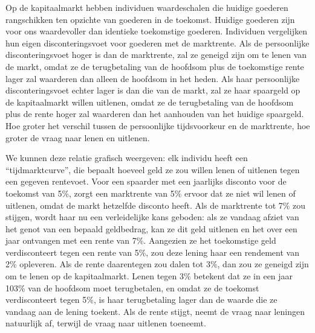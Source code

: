 Op de kapitaalmarkt hebben individuen waardeschalen die huidige goederen rangschikken ten opzichte van goederen in de toekomst. Huidige goederen zijn voor ons waardevoller dan identieke toekomstige goederen. Individuen vergelijken hun eigen disconteringsvoet voor goederen met de marktrente. Als de persoonlijke disconteringsvoet hoger is dan de marktrente, zal ze geneigd zijn om te lenen van de markt, omdat ze de terugbetaling van de hoofdsom plus de toekomstige rente lager zal waarderen dan alleen de hoofdsom in het heden. Als haar persoonlijke disconteringsvoet echter lager is dan die van de markt, zal ze haar spaargeld op de kapitaalmarkt willen uitlenen, omdat ze de terugbetaling van de hoofdsom plus de rente hoger zal waarderen dan het aanhouden van het huidige spaargeld. Hoe groter het verschil tussen de persoonlijke tijdsvoorkeur en de marktrente, hoe groter de vraag naar lenen en uitlenen.

We kunnen deze relatie grafisch weergeven: elk individu heeft een ``tijdmarktcurve'', die bepaalt hoeveel geld ze zou willen lenen of uitlenen tegen een gegeven rentevoet. Voor een spaarder met een jaarlijks disconto voor de toekomst van 5\%, zorgt een marktrente van 5\% ervoor dat ze niet wil lenen of uitlenen, omdat de markt hetzelfde disconto heeft. Als de marktrente tot 7\% zou stijgen, wordt haar nu een verleidelijke kans geboden: als ze vandaag afziet van het genot van een bepaald geldbedrag, kan ze dit geld uitlenen en het over een jaar ontvangen met een rente van 7\%. Aangezien ze het toekomstige geld verdisconteert tegen een rente van 5\%, zou deze lening haar een rendement van 2\% opleveren. Als de rente daarentegen zou dalen tot 3\%, dan zou ze geneigd zijn om te lenen op de kapitaalmarkt. Lenen tegen 3\% betekent dat ze in een jaar 103\% van de hoofdsom moet terugbetalen, en omdat ze de toekomst verdisconteert tegen 5\%, is haar terugbetaling lager dan de waarde die ze vandaag aan de lening toekent. Als de rente stijgt, neemt de vraag naar leningen natuurlijk af, terwijl de vraag naar uitlenen toeneemt.

